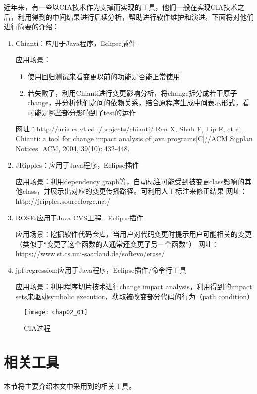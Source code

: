 近年来，有一些以CIA技术作为支撑而实现的工具，他们一般在实现CIA技术之后，利用得到的中间结果进行后续分析，帮助进行软件维护和演进。下面将对他们进行简要的介绍：
\begin{enumerate}
	\item Chianti：应用于Java程序，Eclipse插件

	应用场景：
	\begin{enumerate}
	
		\item 使用回归测试来看变更以前的功能是否能正常使用
		\item 若失败了，利用Chianti进行变更影响分析，将change拆分成若干原子change，并分析他们之间的依赖关系，结合原程序生成中间表示形式，看可能是哪些部分影响到了test的运作
	\end{enumerate}
	网址：http://aria.cs.vt.edu/projects/chianti/
	Ren X, Shah F, Tip F, et al. Chianti: a tool for change impact analysis of java programs[C]//ACM Sigplan Notices. ACM, 2004, 39(10): 432-448.
	
	\item JRipples：应用于Java程序，Eclipse插件
	
	应用场景：利用dependency graph等，自动标注可能受到被变更class影响的其他class，并展示出对应的变更传播路径。可利用人工标注来修正结果
	网址：http://jripples.sourceforge.net/
	
	\item ROSE:应用于Java CVS工程，Eclipse插件

	应用场景：挖掘软件代码仓库，当用户对代码变更时提示用户可能相关的变更（类似于“变更了这个函数的人通常还变更了另一个函数”）
	网址：https://www.st.cs.uni-saarland.de/softevo/erose/
	
	\item jpf-regression:应用于Java程序，Eclipse插件/命令行工具

	应用场景：利用程序切片技术进行change impact analysis，利用得到的impact sets来驱动symbolic execution，获取被改变部分代码的行为（path condition）
\end{enumerate}

\begin{figure}[H]
	\centering
	\texttt{[image: chap02\_01]}
	\caption {CIA过程}
\end{figure}

\section{相关工具}
	本节将主要介绍本文中采用到的相关工具。
	

